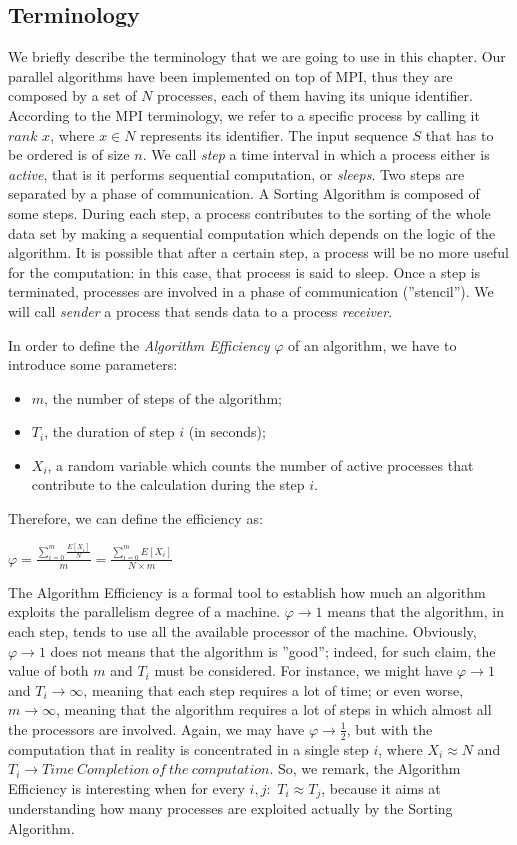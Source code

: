 \label{terminology}
\subsection*{Terminology}
We briefly describe the terminology that we are going to use in this chapter. Our parallel algorithms have been implemented on top of MPI, thus they are composed by a set of $N$ processes, each of them having its unique identifier. According to the MPI terminology, we refer to a specific process by calling it $rank$ $x$, where $x \in N$ represents its identifier. The input sequence $S$ that has to be ordered is of size $n$. We call \textit{step} a time interval in which a process either is \textit{active}, that is it performs sequential computation, or \textit{sleeps}. Two steps are separated by a phase of communication. A Sorting Algorithm is composed of some steps. During each step, a process contributes to the sorting of the whole data set by making a sequential computation which depends on the logic of the algorithm. It is possible that after a certain step, a process will be no more useful for the computation: in this case, that process is said to sleep. Once a step is terminated, processes are involved in a phase of communication (''stencil''). We will call \textit{sender} a process that sends data to a process \textit{receiver}.

In order to define the \textit{Algorithm Efficiency} $\varphi$ of an algorithm, we have to introduce some parameters:
\begin{itemize}
\item $m$, the number of steps of the algorithm;
\item $T_i$, the duration of step $i$ (in seconds);
\item $X_i$, a random variable which counts the number of active processes that contribute to the calculation during the step $i$.
\end{itemize}
Therefore, we can define the efficiency as:
\begin{center}
$\varphi = \frac{\sum_{i=0}^m \frac{E[X_i]}{N}}{m} = \frac{\sum_{i=0}^m E[X_i]}{N \times m} $
\end{center}
The Algorithm Efficiency is a formal tool to establish how much an algorithm exploits the parallelism degree of a machine. $\varphi \rightarrow 1$ means that the algorithm, in each step, tends to use all the available processor of the machine. Obviously, $\varphi \rightarrow 1$ does not means that the algorithm is ''good''; indeed, for such claim, the value of both $m$ and $T_i$ must be considered. For instance, we might have $\varphi \rightarrow 1$ and $T_i \rightarrow\infty$, meaning that each step requires a lot of time; or even worse, $m \rightarrow\infty$, meaning that the algorithm requires a lot of steps in which almost all the processors are involved. Again, we may have $\varphi \rightarrow \frac{1}{2}$, but with the computation that in reality is concentrated in a single step $i$, where $X_i \approx N$ and $T_i \rightarrow Time\ Completion\ of\ the\ computation$. So, we remark, the Algorithm Efficiency is interesting when for every $i, j:$ $T_i \approx T_j$, because it aims at understanding how many processes are exploited actually by the Sorting Algorithm.


